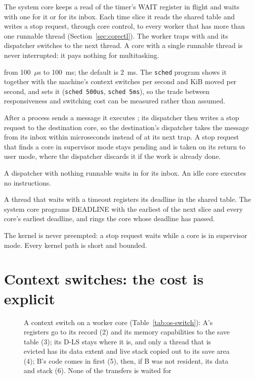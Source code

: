 \begin{description}[leftmargin=1em,style=nextline]
\item[The time slice] The system core keeps a read of the timer's WAIT register in flight and waits
  with one  for it or for its inbox. Each time slice it reads the shared table and writes a
  stop request, through core control, to every worker that has more than one runnable thread
  (Section~\ref{sec:corectl}). The worker traps with  and its dispatcher switches to the next
  thread. A core with a single runnable thread is never interrupted: it pays nothing for multitasking.
\item[The slice is configurable] from 100~$\mu$s to 100~ms; the default is 2~ms. The \texttt{sched}
  program shows it together with the machine's context switches per second and KiB moved per second,
  and sets it (\texttt{sched 500us}, \texttt{sched 5ms}), so the trade between responsiveness and
  switching cost can be measured rather than assumed.
\item[Doorbells] After a process sends a message it executes ; its dispatcher then writes a
  stop request to the destination core, so the destination's dispatcher takes the message from its
  inbox within microseconds instead of at its next trap. A stop request that finds a core in supervisor
  mode stays pending and is taken on its return to user mode, where the dispatcher discards it if the
  work is already done.
\item[Idle] A dispatcher with nothing runnable waits in  for its inbox. An idle core
  executes no instructions.
\item[Timed waits] A thread that waits with a timeout registers its deadline in the shared table. The
  system core programs DEADLINE with the earliest of the next slice and every core's earliest deadline,
  and rings the core whose deadline has passed.
\end{description}

The kernel is never preempted: a stop request waits while a core is in supervisor mode. Every kernel
path is short and bounded.

\section{Context switches: the cost is explicit}\label{sec:os-switch}

\begin{figure}[htbp]
\centering

\caption{A context switch on a worker core (Table~\ref{tab:os-switch}): A's registers go to its record (2) and its memory capabilities to the save table (3); its D-LS stays where it is, and only a thread that is evicted has its data extent and live stack copied out to its save area (4); B's code comes in first (5), then, if B was not resident, its data and stack (6). None of the transfers is waited for}\label{fig:os-switch}
\end{figure}


